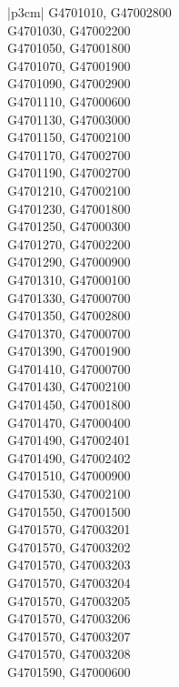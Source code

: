 \begin{customLongTable}{ |p{3cm}| }
G4701010, G47002800 \\ \hline
G4701030, G47002200 \\ \hline
G4701050, G47001800 \\ \hline
G4701070, G47001900 \\ \hline
G4701090, G47002900 \\ \hline
G4701110, G47000600 \\ \hline
G4701130, G47003000 \\ \hline
G4701150, G47002100 \\ \hline
G4701170, G47002700 \\ \hline
G4701190, G47002700 \\ \hline
G4701210, G47002100 \\ \hline
G4701230, G47001800 \\ \hline
G4701250, G47000300 \\ \hline
G4701270, G47002200 \\ \hline
G4701290, G47000900 \\ \hline
G4701310, G47000100 \\ \hline
G4701330, G47000700 \\ \hline
G4701350, G47002800 \\ \hline
G4701370, G47000700 \\ \hline
G4701390, G47001900 \\ \hline
G4701410, G47000700 \\ \hline
G4701430, G47002100 \\ \hline
G4701450, G47001800 \\ \hline
G4701470, G47000400 \\ \hline
G4701490, G47002401 \\ \hline
G4701490, G47002402 \\ \hline
G4701510, G47000900 \\ \hline
G4701530, G47002100 \\ \hline
G4701550, G47001500 \\ \hline
G4701570, G47003201 \\ \hline
G4701570, G47003202 \\ \hline
G4701570, G47003203 \\ \hline
G4701570, G47003204 \\ \hline
G4701570, G47003205 \\ \hline
G4701570, G47003206 \\ \hline
G4701570, G47003207 \\ \hline
G4701570, G47003208 \\ \hline
G4701590, G47000600 \\ \hline

\end{customLongTable}
